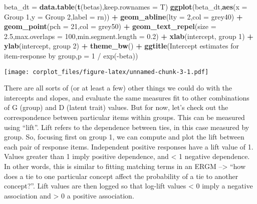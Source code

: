 \documentclass[
]{article}
\newenvironment{Shaded}{\begin{snugshade}}{\end{snugshade}}
\newcommand{\DataTypeTok}[1]{\textcolor[rgb]{0.13,0.29,0.53}{#1}}
\newcommand{\DecValTok}[1]{\textcolor[rgb]{0.00,0.00,0.81}{#1}}
\newcommand{\FloatTok}[1]{\textcolor[rgb]{0.00,0.00,0.81}{#1}}
\newcommand{\KeywordTok}[1]{\textcolor[rgb]{0.13,0.29,0.53}{\textbf{#1}}}
\newcommand{\NormalTok}[1]{#1}
\newcommand{\OperatorTok}[1]{\textcolor[rgb]{0.81,0.36,0.00}{\textbf{#1}}}
\newcommand{\StringTok}[1]{\textcolor[rgb]{0.31,0.60,0.02}{#1}}
\begin{document}
\begin{Shaded}
\begin{Highlighting}[]
\NormalTok{beta\_dt =}\StringTok{ }\KeywordTok{data.table}\NormalTok{(}\KeywordTok{t}\NormalTok{(betas),}\DataTypeTok{keep.rownames =}\NormalTok{ T)}
\KeywordTok{ggplot}\NormalTok{(beta\_dt,}\KeywordTok{aes}\NormalTok{(}\DataTypeTok{x =} \StringTok{\textasciigrave{}}\DataTypeTok{Group 1}\StringTok{\textasciigrave{}}\NormalTok{,}\DataTypeTok{y =} \StringTok{\textasciigrave{}}\DataTypeTok{Group 2}\StringTok{\textasciigrave{}}\NormalTok{,}\DataTypeTok{label =}\NormalTok{ rn)) }\OperatorTok{+}\StringTok{ }\KeywordTok{geom\_abline}\NormalTok{(}\DataTypeTok{lty =} \DecValTok{2}\NormalTok{,}\DataTypeTok{col =} \StringTok{\textquotesingle{}grey40\textquotesingle{}}\NormalTok{) }\OperatorTok{+}
\StringTok{  }\KeywordTok{geom\_point}\NormalTok{(}\DataTypeTok{pch =} \DecValTok{21}\NormalTok{,}\DataTypeTok{col =} \StringTok{\textquotesingle{}grey50\textquotesingle{}}\NormalTok{) }\OperatorTok{+}\StringTok{ }\KeywordTok{geom\_text\_repel}\NormalTok{(}\DataTypeTok{size =} \FloatTok{2.5}\NormalTok{,}\DataTypeTok{max.overlaps =} \DecValTok{100}\NormalTok{,}\DataTypeTok{min.segment.length =} \FloatTok{0.2}\NormalTok{) }\OperatorTok{+}
\StringTok{  }\KeywordTok{xlab}\NormalTok{(}\StringTok{\textquotesingle{}intercept, group 1\textquotesingle{}}\NormalTok{) }\OperatorTok{+}\StringTok{ }\KeywordTok{ylab}\NormalTok{(}\StringTok{\textquotesingle{}intercept, group 2\textquotesingle{}}\NormalTok{) }\OperatorTok{+}\StringTok{ }\KeywordTok{theme\_bw}\NormalTok{() }\OperatorTok{+}\StringTok{ }\KeywordTok{ggtitle}\NormalTok{(}\StringTok{\textquotesingle{}Intercept estimates for item{-}response by group\textquotesingle{}}\NormalTok{,}\StringTok{\textquotesingle{}p = 1 / exp({-}beta)\textquotesingle{}}\NormalTok{)}
\end{Highlighting}
\end{Shaded}

\texttt{[image: corplot\_files/figure-latex/unnamed-chunk-3-1.pdf]}

There are all sorts of (or at least a few) other things we could do with
the intercepts and slopes, and evaluate the same measures fit to other
combinations of G (group) and D (latent trait) values. But for now,
let's check out the correspondence between particular items within
groups. This can be measured using ``lift''. Lift refers to the
dependence between ties, in this case measured by group. So, focusing
first on group 1, we can compute and plot the lift between each pair of
response items. Independent positive responses have a lift value of 1.
Values greater than 1 imply positive dependence, and \textless{} 1
negative dependence. In other words, this is similar to fitting matching
terms in an ERGM --\textgreater{} ``how does a tie to one particular
concept affect the probability of a tie to another concept?''. Lift
values are then logged so that log-lift values \textless{} 0 imply a
negative association and \textgreater{} 0 a positive association.
\end{document}
